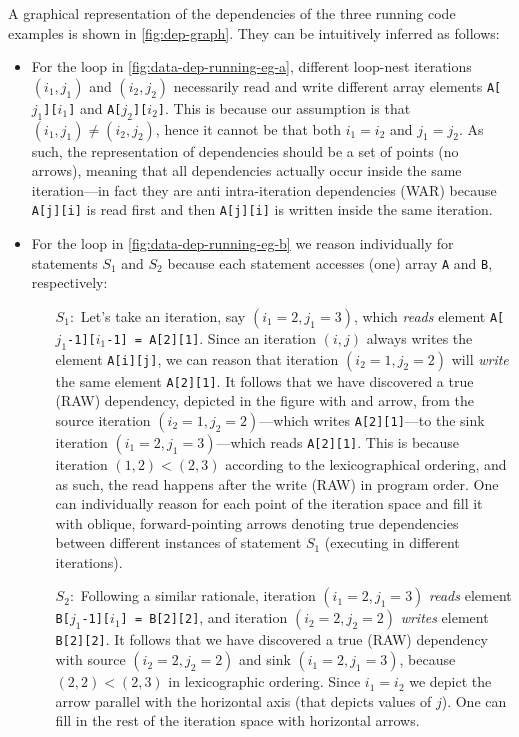 A graphical representation of the dependencies of the three running code
examples is shown in \cref{fig:dep-graph}.   They can be intuitively inferred
as follows:
\begin{itemize}
\item For the loop in \cref{fig:data-dep-running-eg-a}, different
  loop-nest iterations $(i_1,j_1)$ and $(i_2,j_2)$ necessarily read
  and write different array elements \texttt{A[$j_1$][$i_1$]} and
  \texttt{A[$j_2$][$i_2$]}.  This is because our assumption is that
  $(i_1,j_1) \neq (i_2,j_2)$, hence it cannot be that both $i_1 = i_2$
  and $j_1 = j_2$. As such, the representation of dependencies should
  be a set of points (no arrows), meaning that all dependencies
  actually occur inside the same iteration---in fact they are anti
  intra-iteration dependencies (WAR) because \texttt{A[j][i]} is read
  first and then \texttt{A[j][i]} is written inside the same
  iteration.
\item For the loop in \cref{fig:data-dep-running-eg-b} we reason
  individually for statements $S_1$ and $S_2$ because each statement
  accesses (one) array \texttt{A} and \texttt{B}, respectively:
  \begin{itemize}
  \item[$S_1:$] Let's take an iteration, say $(i_1=2, j_1=3)$,
    which \emph{reads} element \texttt{A[$j_1$-1][$i_1$-1] = A[2][1]}.
    Since an iteration $(i,j)$ always writes the element
    \texttt{A[i][j]}, we can reason that iteration $(i_2=1, j_2=2)$
    will \emph{write} the same element \texttt{A[2][1]}.
    It follows that we have discovered a true (RAW) dependency,
    depicted in the figure with and arrow, from the source
    iteration $(i_2=1, j_2=2)$---which writes \texttt{A[2][1]}---to
    the sink iteration $(i_1=2, j_1=3)$---which reads \texttt{A[2][1]}.
    This is because iteration $(1,2) < (2,3)$ according to the
    lexicographical ordering, and as such, the read happens after
    the write (RAW) in program order. One can individually reason
    for each point of the iteration space and fill it with oblique,
    forward-pointing arrows denoting true dependencies between
    different instances of statement $S_1$
    (executing in different iterations).
  \item[$S_2:$] Following a similar rationale, iteration $(i_1=2, j_1=3)$
    \emph{reads} element \texttt{B[$j_1$-1][$i_1$] = B[2][2]}, and
    iteration $(i_2=2, j_2=2)$ \emph{writes} element \texttt{B[2][2]}.
    It follows that we have discovered a true (RAW) dependency
    with source $(i_2=2, j_2=2)$ and sink $(i_1=2, j_1=3)$,
    because $(2,2) < (2,3)$ in lexicographic ordering.
    Since $i_1=i_2$ we depict the arrow parallel with the
    horizontal axis (that depicts values of $j$). One can
    fill in the rest of the iteration space with horizontal arrows.
  \end{itemize}


\end{itemize}

